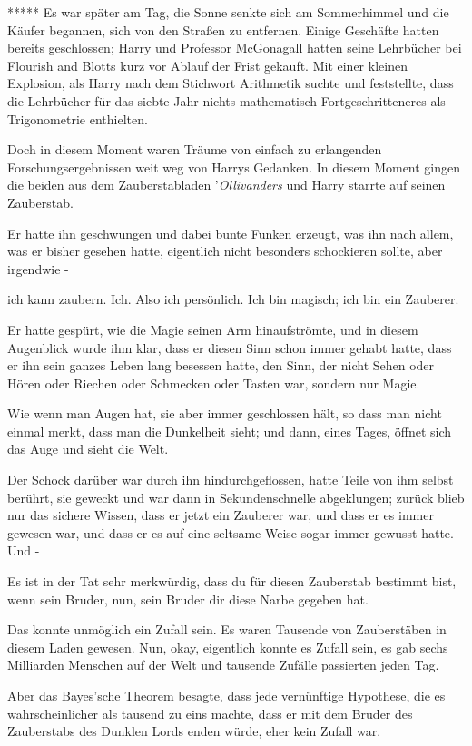 ***** Es war später am Tag, die Sonne senkte sich am Sommerhimmel und die Käufer
begannen, sich von den Straßen zu entfernen. Einige Geschäfte hatten bereits
geschlossen; Harry und Professor McGonagall hatten seine Lehrbücher bei Flourish
and Blotts kurz vor Ablauf der Frist gekauft. Mit einer kleinen Explosion, als
Harry nach dem Stichwort \glqq Arithmetik\grqq{} suchte und feststellte, dass die
Lehrbücher für das siebte Jahr nichts mathematisch Fortgeschritteneres als
Trigonometrie enthielten.

Doch in diesem Moment waren Träume von einfach zu erlangenden
Forschungsergebnissen weit weg von Harrys Gedanken. In diesem Moment gingen
die beiden aus dem Zauberstabladen '\emph{Ollivanders} und Harry starrte auf
seinen Zauberstab.

Er hatte ihn geschwungen und dabei bunte Funken erzeugt, was ihn nach allem, was
er bisher gesehen hatte, eigentlich nicht besonders schockieren sollte, aber
irgendwie -

ich kann zaubern. Ich. Also ich persönlich. Ich bin magisch; ich bin ein
Zauberer.

Er hatte gespürt, wie die Magie seinen Arm hinaufströmte, und in diesem
Augenblick wurde ihm klar, dass er diesen Sinn schon immer gehabt hatte,
dass er ihn sein ganzes Leben lang besessen hatte, den Sinn, der nicht Sehen
oder Hören oder Riechen oder Schmecken oder Tasten war, sondern nur Magie.

Wie wenn man Augen hat, sie aber immer geschlossen hält, so dass man nicht
einmal merkt, dass man die Dunkelheit sieht; und dann, eines Tages, öffnet
sich das Auge und sieht die Welt.

Der Schock darüber war durch ihn hindurchgeflossen, hatte Teile von ihm selbst
berührt, sie geweckt und war dann in Sekundenschnelle abgeklungen; zurück
blieb nur das sichere Wissen, dass er jetzt ein Zauberer war, und dass er es
immer gewesen war, und dass er es auf eine seltsame Weise sogar immer
gewusst hatte. Und -

\glqq Es ist in der Tat sehr merkwürdig, dass du für diesen Zauberstab bestimmt
bist, wenn sein Bruder, nun, sein Bruder dir diese Narbe gegeben hat.\grqq{}

Das konnte unmöglich ein Zufall sein. Es waren Tausende von Zauberstäben in
diesem Laden gewesen. Nun, okay, eigentlich konnte es Zufall sein, es gab
sechs Milliarden Menschen auf der Welt und tausende Zufälle passierten jeden
Tag.

Aber das Bayes'sche Theorem besagte, dass jede vernünftige Hypothese, die es
wahrscheinlicher als tausend zu eins machte, dass er mit dem Bruder des
Zauberstabs des Dunklen Lords enden würde, eher kein Zufall war.

